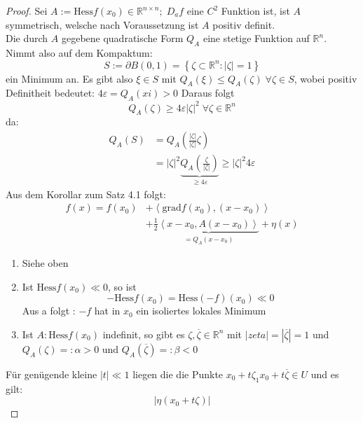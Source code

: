  \begin{proof}
	 Sei $ A := \text{Hess} f \left(x_0\right) \in  \mathbb{R}^{n \times n}; \; D_{a} f    $ eine $ C^{2} $ Funktion ist, ist $ A $ 
	 symmetrisch, welsche nach Voraussetzung ist $ A $ positiv definit. \\
	 Die durch $ A $ gegebene quadratische Form $ Q_{A} $ eine stetige Funktion auf $ \mathbb{R}^n  $. Nimmt also auf dem Kompaktum: 
	 $$ S := \partial B \left( 0, 1 \right) = \left\{ \zeta \subset \mathbb{R}^n : | \zeta| = 1 \right\}  $$
		ein Minimum an. Es gibt also $ \xi \in  S $ mit $ Q_{A} \left(\xi\right)  \leq  Q_{A} \left(\zeta\right) \; \forall  \zeta \in S $,
		wobei positiv Definitheit bedeutet: $ 4 \varepsilon  = Q_{A} \left(xi\right) > 0 $ 
		Daraus folgt
		\begin{equation}
			Q_{A} \left(\zeta\right) \geq 4 \varepsilon |\zeta|^{2} \; \forall \zeta \in  \mathbb{R}^n
			\tag{1}
		\end{equation}
		da: 
		\begin{align*}
			Q_{A} \left(S\right)  &= Q_{A} \left( \frac{|\zeta|}{|\zeta|} \zeta  \right)  \\
			&= |\zeta|^{2} \underbrace{Q_{A} \left( \frac{\zeta}{|\zeta|}  \right) }_{ \geq 4 \varepsilon  } \geq |\zeta|^{2} 4 \varepsilon 
		\end{align*}
	Aus  dem Korollar zum Satz 4.1 folgt:
	\begin{align*}
		f \left(x\right)  = f \left(x_0\right)  &+ \left< \text{grad} f \left(x_0\right) , \left( x - x_0 \right)  \right> \\
		&+ \frac{1}{2} \underbrace{ \left< x- x_0, A \left( x - x_0 \right)  \right>}_{= Q_{A}\left( x-x_0 \right)} + \eta \left(x\right)
	\end{align*}
	\begin{enumerate}[label=\alph*)]
		\item Siehe oben 
		\item Ist $ \text{Hess} f \left(x_0\right)  \ll 0 $, so ist 
			$$ - \text{Hess} f \left(x_0\right)  = \text{Hess} \left( -f \right) \left(x_0\right) \ll 0 $$
		Aus a folgt : $ -f $ hat in $ x_0  $ ein isoliertes lokales Minimum 	
	\item Ist $ A : \text{Hess}f \left(x_0\right) $ indefinit, so gibt es $ \zeta,  \overline{\zeta} \in  \mathbb{R}^n  $ mit 
	$ |zeta| = | \overline{\zeta}| = 1 $ und $ Q_{A} \left(\zeta\right) =: \alpha > 0  \text{ und } Q_{A} ( \overline{\zeta}) =: 
	\beta < 0$ 
	\end{enumerate}
	Für genügende kleine $ |t| \ll 1 $ liegen die die Punkte $ x_0 + t \zeta_{1} x_0 + t \overline{\zeta} \in U $ und es gilt: 
	$$ \left| \eta \left( x_0 + t \zeta \right) \right| $$
 \end{proof}

